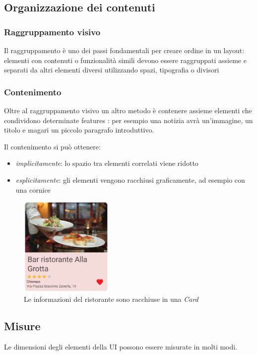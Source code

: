 \documentclass[12pt, a4paper]{report}
\begin{document}
		\subsection{Organizzazione dei contenuti}
			\subsubsection{Raggruppamento visivo}
			Il raggruppamento è uno dei passi fondamentali per creare ordine in un layout: elementi con contenuti o funzionalità simili devono essere raggruppati assieme e separati da altri elementi diversi utilizzando spazi, tipografia o divisori

			\subsubsection{Contenimento}
			Oltre al raggruppamento visivo un altro metodo è contenere assieme elementi che condividono determinate features			\cite{layout_organizzazione}:
			per esempio una notizia avrà un'immagine, un titolo e magari un piccolo paragrafo introduttivo.

			Il contenimento si può ottenere:
			\begin{itemize}
				\item \textit{implicitamente}: lo spazio tra elementi correlati viene ridotto
    			\item \textit{esplicitamente}: gli elementi vengono racchiusi graficamente, ad esempio con una cornice
			\end{itemize}

		\begin{figure}[h]
   			\centering
   			\includegraphics[width=0.4\textwidth]{contenimento}
 			\caption{Le informazioni del ristorante sono racchiuse in una \textit{Card}}
    			\label{fig:mesh1}
		\end{figure}

		\subsection{Misure}
		Le dimensioni degli elementi della UI possono essere misurate in molti modi.
\end{document}
